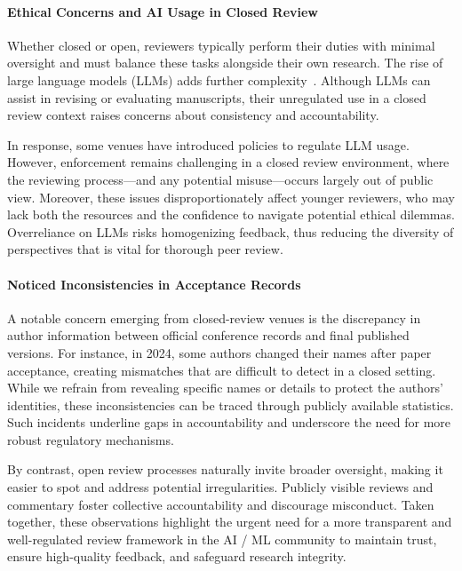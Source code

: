 
\paragraph{Ethical Concerns and AI Usage in Closed Review}
Whether closed or open, reviewers typically perform their duties with minimal oversight and must balance these tasks alongside their own research. The rise of large language models (LLMs) adds further complexity~\cite{kuznetsov2024can, seghier2024ai, zhang2022investigating}. Although LLMs can assist in revising or evaluating manuscripts, their unregulated use in a closed review context raises concerns about consistency and accountability.

In response, some venues have introduced policies to regulate LLM usage. However, enforcement remains challenging in a closed review environment, where the reviewing process—and any potential misuse—occurs largely out of public view. Moreover, these issues disproportionately affect younger reviewers, who may lack both the resources and the confidence to navigate potential ethical dilemmas. Overreliance on LLMs risks homogenizing feedback, thus reducing the diversity of perspectives that is vital for thorough peer review.

\paragraph{Noticed Inconsistencies in Acceptance Records}

A notable concern emerging from closed-review venues is the discrepancy in author information between official conference records and final published versions. For instance, in 2024, some authors changed their names after paper acceptance, creating mismatches that are difficult to detect in a closed setting. While we refrain from revealing specific names or details to protect the authors’ identities, these inconsistencies can be traced through publicly available statistics. Such incidents underline gaps in accountability and underscore the need for more robust regulatory mechanisms.

By contrast, open review processes naturally invite broader oversight, making it easier to spot and address potential irregularities. Publicly visible reviews and commentary foster collective accountability and discourage misconduct. Taken together, these observations highlight the urgent need for a more transparent and well-regulated review framework in the AI / ML community to maintain trust, ensure high-quality feedback, and safeguard research integrity.

